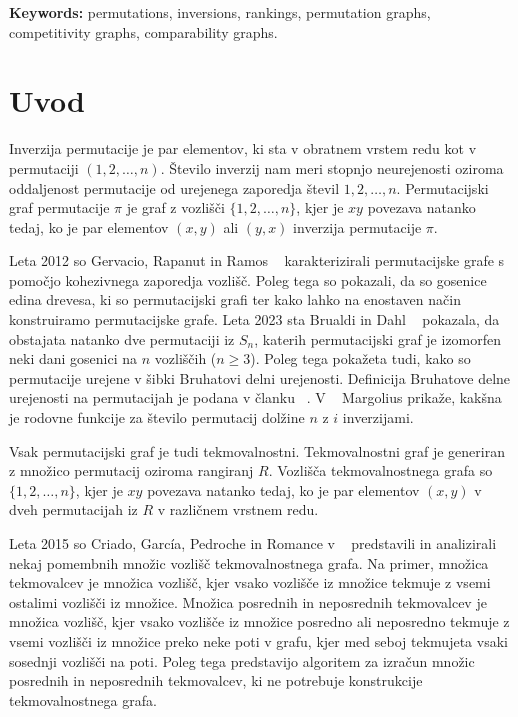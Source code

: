 \documentclass[a4paper, 12pt]{book}
\newcommand{\tkeywordsEn}{permutations, inversions, rankings, permutation graphs, competitivity graphs, comparability graphs}
\newcommand{\clearemptydoublepage}{\newpage{\pagestyle{empty}\cleardoublepage}}
\begin{document}
\noindent\textbf{Keywords:} \tkeywordsEn.
\clearemptydoublepage

\mainmatter
\setcounter{page}{1}
\pagestyle{fancy}

\chapter {Uvod}

Inverzija permutacije je par elementov, ki sta v obratnem vrstem redu kot v permutaciji $(1, 2,\dots, n)$. Število inverzij nam meri stopnjo neurejenosti oziroma oddaljenost permutacije od urejenega zaporedja števil $1, 2, \dots, n$. Permutacijski graf permutacije $\pi$ je graf z vozlišči $\{ 1, 2, \dots, n \}$, kjer je $xy$ povezava natanko tedaj, ko je par elementov $(x, y)$ ali $(y, x)$ inverzija permutacije $\pi$. 

Leta 2012 so Gervacio, Rapanut in Ramos ~\cite{charectarizationPermutationGraphs} karakterizirali permutacijske grafe s pomočjo kohezivnega zaporedja vozlišč. Poleg tega so pokazali, da so gosenice edina drevesa, ki so permutacijski grafi ter kako lahko na enostaven način konstruiramo permutacijske grafe. Leta 2023 sta Brualdi in Dahl ~\cite{weakBruhatOrder} pokazala, da obstajata natanko dve permutaciji iz $S_n$, katerih permutacijski graf je izomorfen neki dani gosenici na $n$ vozliščih ($n \geq 3$). Poleg tega pokažeta tudi, kako so permutacije urejene v šibki Bruhatovi delni urejenosti. Definicija Bruhatove delne urejenosti na permutacijah je podana v članku ~\cite{bruhatOrder}. V ~\cite{generatingFunction} Margolius prikaže, kakšna je rodovne funkcije za število permutacij dolžine $n$ z $i$ inverzijami.

Vsak permutacijski graf je tudi tekmovalnostni. Tekmovalnostni graf je generiran z množico permutacij oziroma rangiranj $R$. Vozlišča tekmovalnostnega grafa so $\{ 1, 2, \dots, n \}$, kjer je $xy$ povezava natanko tedaj, ko je par elementov $(x, y)$ v dveh permutacijah iz $R$ v različnem vrstnem redu. 

Leta 2015 so Criado, García, Pedroche in Romance v ~\cite{setsOfRankings} predstavili in analizirali nekaj pomembnih množic vozlišč tekmovalnostnega grafa. Na primer, množica tekmovalcev je množica vozlišč, kjer vsako vozlišče iz množice tekmuje z vsemi ostalimi vozlišči iz množice. Množica posrednih in neposrednih tekmovalcev je množica vozlišč, kjer vsako vozlišče iz množice posredno ali neposredno tekmuje z vsemi vozlišči iz množice preko neke poti v grafu, kjer med seboj tekmujeta vsaki sosednji vozlišči na poti. Poleg tega predstavijo algoritem za izračun množic posrednih in neposrednih tekmovalcev, ki ne potrebuje konstrukcije tekmovalnostnega grafa.
\end{document}
